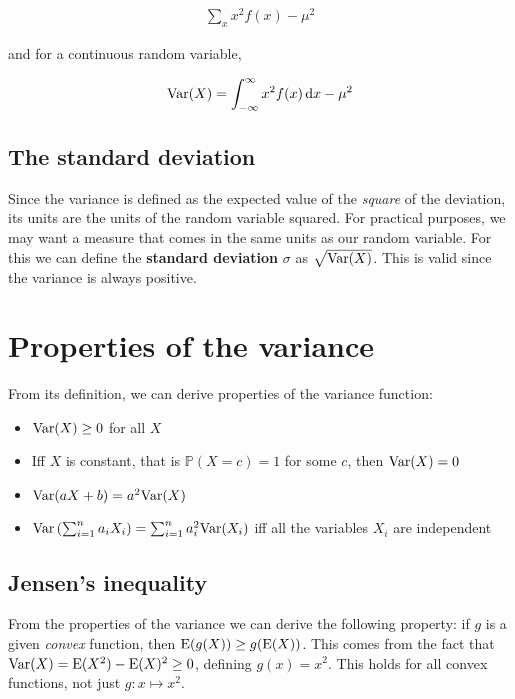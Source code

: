 \begin{align*}
  \sum_x x^2 f(x) - \mu^2
\end{align*}

and for a continuous random variable,

\begin{align*}
  \mathrm{Var}(X) = \int_{-\infty}^{\infty} x^2 f(x) \mathop{}\!\mathrm{d} x - \mu^2
\end{align*}

\subsection{The standard deviation}
Since the variance is defined as the expected value of the \textit{square} of the deviation, its units are the units of the random variable squared. For practical purposes, we may want a measure that comes in the same units as our random variable. For this we can define the \textbf{standard deviation} $\sigma$ as $\sqrt{\mathrm{Var}(X)}$. This is valid since the variance is always positive.

\section{Properties of the variance}
From its definition, we can derive properties of the variance function:

\begin{itemize}
  \item $\mathrm{Var}(X) \geq 0$ for all $X$
  \item Iff $X$ is constant, that is $\mathbb{P}(X = c) = 1$ for some $c$, then $\mathrm{Var}(X) = 0$
  \item $\mathrm{Var}(aX + b) = a^2\mathrm{Var}(X)$
  \item $\mathrm{Var}\left(\sum_{i = 1}^n a_iX_i\right) = \sum_{i = 1}^n a_i^2\mathrm{Var}(X_i)$ iff all the variables $X_i$ are independent
\end{itemize}

\subsection{Jensen's inequality}
From the properties of the variance we can derive the following property: if $g$ is a given \textit{convex} function, then $\mathrm{E}(g(X)) \geq g(\mathrm{E}(X))$. This comes from the fact that $\mathrm{Var}(X) = \mathrm{E}(X^2) - \mathrm{E}(X)^2 \geq 0$, defining $g(x) = x^2$. This holds for all convex functions, not just $g: x \mapsto x^2$.


